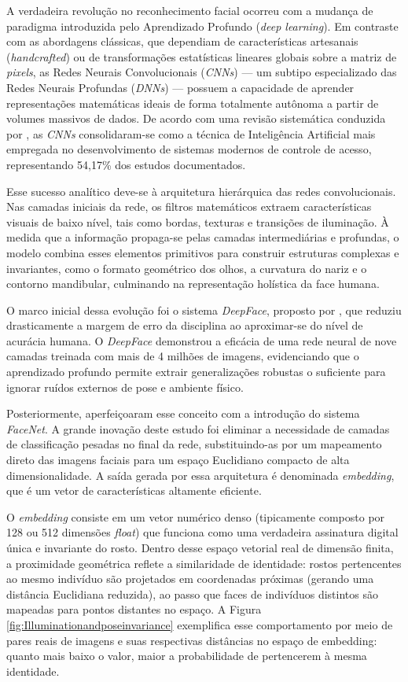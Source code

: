 A verdadeira revolução no reconhecimento facial ocorreu com a mudança de paradigma introduzida pelo Aprendizado Profundo (\textit{deep learning}). Em contraste com as abordagens clássicas, que dependiam de características artesanais (\textit{handcrafted}) ou de transformações estatísticas lineares globais sobre a matriz de \textit{pixels}, as Redes Neurais Convolucionais (\textit{CNNs}) — um subtipo especializado das Redes Neurais Profundas (\textit{DNNs}) — possuem a capacidade de aprender representações matemáticas ideais de forma totalmente autônoma a partir de volumes massivos de dados. De acordo com uma revisão sistemática conduzida por , as \textit{CNNs} consolidaram-se como a técnica de Inteligência Artificial mais empregada no desenvolvimento de sistemas modernos de controle de acesso, representando 54,17\% dos estudos documentados.

Esse sucesso analítico deve-se à arquitetura hierárquica das redes convolucionais. Nas camadas iniciais da rede, os filtros matemáticos extraem características visuais de baixo nível, tais como bordas, texturas e transições de iluminação. À medida que a informação propaga-se pelas camadas intermediárias e profundas, o modelo combina esses elementos primitivos para construir estruturas complexas e invariantes, como o formato geométrico dos olhos, a curvatura do nariz e o contorno mandibular, culminando na representação holística da face humana.

O marco inicial dessa evolução foi o sistema \textit{DeepFace}, proposto por , que reduziu drasticamente a margem de erro da disciplina ao aproximar-se do nível de acurácia humana. O \textit{DeepFace} demonstrou a eficácia de uma rede neural de nove camadas treinada com mais de 4 milhões de imagens, evidenciando que o aprendizado profundo permite extrair generalizações robustas o suficiente para ignorar ruídos externos de pose e ambiente físico.

Posteriormente,  aperfeiçoaram esse conceito com a introdução do sistema \textit{FaceNet}. A grande inovação deste estudo foi eliminar a necessidade de camadas de classificação pesadas no final da rede, substituindo-as por um mapeamento direto das imagens faciais para um espaço Euclidiano compacto de alta dimensionalidade. A saída gerada por essa arquitetura é denominada \textit{embedding}, que é um vetor de características altamente eficiente.

O \textit{embedding} consiste em um vetor numérico denso (tipicamente composto por 128 ou 512 dimensões \textit{float}) que funciona como uma verdadeira assinatura digital única e invariante do rosto. Dentro desse espaço vetorial real de dimensão finita, a proximidade geométrica reflete a similaridade de identidade: rostos pertencentes ao mesmo indivíduo são projetados em coordenadas próximas (gerando uma distância Euclidiana reduzida), ao passo que faces de indivíduos distintos são mapeadas para pontos distantes no espaço. A Figura \ref{fig:Illuminationandposeinvariance} exemplifica esse comportamento por meio de pares reais de imagens e suas respectivas distâncias no espaço de embedding: quanto mais baixo o valor, maior a probabilidade de pertencerem à mesma identidade.

